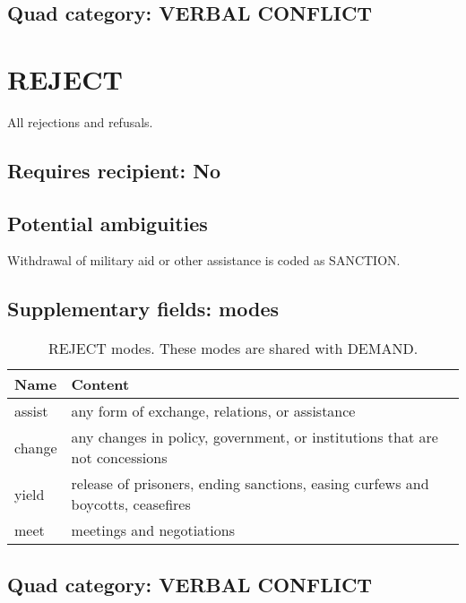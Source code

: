\documentclass[11pt]{report}
\newcommand{\plcat}[1]{\textsf{#1}}
\begin{document}
\subsection{Quad category: VERBAL CONFLICT}

\newpage


\section{REJECT}

All rejections and refusals.

\subsection{Requires recipient: No}

\subsection{Potential ambiguities}

Withdrawal of military aid or other assistance is coded as \plcat{SANCTION}.


\subsection{Supplementary fields: modes}

\begin{table}[htp]
\caption{\plcat{REJECT} modes. These modes are shared with \plcat{DEMAND}.}
\begin{center}
\begin{tabular}{|l|p{13cm}|}
\hline
Name & Content \\
\hline
assist & any form of exchange, relations, or assistance\\
change & any changes in policy, government, or institutions that are not concessions \\
yield & release of prisoners, ending sanctions, easing curfews and boycotts, ceasefires\\
meet & meetings and negotiations\\
\hline
\end{tabular}
\end{center}
\label{tab:rejectmode}
\end{table}%


\subsection{Quad category: VERBAL CONFLICT}
\end{document}
